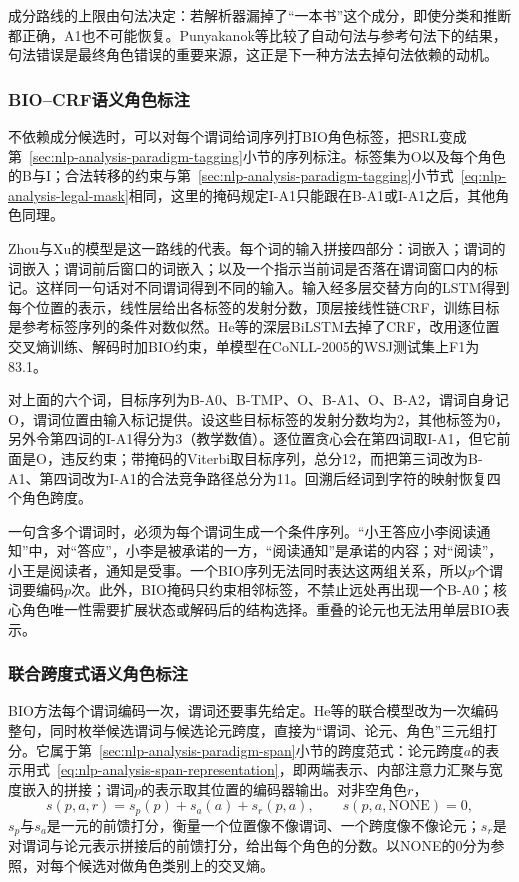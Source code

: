 成分路线的上限由句法决定：若解析器漏掉了“一本书”这个成分，即使分类和推断都正确，A1也不可能恢复。Punyakanok等比较了自动句法与参考句法下的结果，句法错误是最终角色错误的重要来源，这正是下一种方法去掉句法依赖的动机。

\subsubsection{BIO--CRF语义角色标注}
\label{sec:nlp-analysis-srl-crf}

不依赖成分候选时，可以对每个谓词给词序列打BIO角色标签，把SRL变成第~\ref{sec:nlp-analysis-paradigm-tagging}小节的序列标注。标签集为O以及每个角色的B与I；合法转移的约束与第~\ref{sec:nlp-analysis-paradigm-tagging}小节式~\eqref{eq:nlp-analysis-legal-mask}相同，这里的掩码规定I-A1只能跟在B-A1或I-A1之后，其他角色同理。

Zhou与Xu的模型是这一路线的代表。每个词的输入拼接四部分：词嵌入；谓词的词嵌入；谓词前后窗口的词嵌入；以及一个指示当前词是否落在谓词窗口内的标记。这样同一句话对不同谓词得到不同的输入。输入经多层交替方向的LSTM得到每个位置的表示，线性层给出各标签的发射分数，顶层接线性链CRF，训练目标是参考标签序列的条件对数似然。He等的深层BiLSTM去掉了CRF，改用逐位置交叉熵训练、解码时加BIO约束，单模型在CoNLL-2005的WSJ测试集上F1为83.1。

对上面的六个词，目标序列为B-A0、B-TMP、O、B-A1、O、B-A2，谓词自身记O，谓词位置由输入标记提供。设这些目标标签的发射分数均为2，其他标签为0，另外令第四词的I-A1得分为3（教学数值）。逐位置贪心会在第四词取I-A1，但它前面是O，违反约束；带掩码的Viterbi取目标序列，总分12，而把第三词改为B-A1、第四词改为I-A1的合法竞争路径总分为11。回溯后经词到字符的映射恢复四个角色跨度。

一句含多个谓词时，必须为每个谓词生成一个条件序列。“小王答应小李阅读通知”中，对“答应”，小李是被承诺的一方，“阅读通知”是承诺的内容；对“阅读”，小王是阅读者，通知是受事。一个BIO序列无法同时表达这两组关系，所以$p$个谓词要编码$p$次。此外，BIO掩码只约束相邻标签，不禁止远处再出现一个B-A0；核心角色唯一性需要扩展状态或解码后的结构选择。重叠的论元也无法用单层BIO表示。

\subsubsection{联合跨度式语义角色标注}
\label{sec:nlp-analysis-srl-span}

BIO方法每个谓词编码一次，谓词还要事先给定。He等的联合模型改为一次编码整句，同时枚举候选谓词与候选论元跨度，直接为“谓词、论元、角色”三元组打分。它属于第~\ref{sec:nlp-analysis-paradigm-span}小节的跨度范式：论元跨度$a$的表示用式~\eqref{eq:nlp-analysis-span-representation}，即两端表示、内部注意力汇聚与宽度嵌入的拼接；谓词$p$的表示取其位置的编码器输出。对非空角色$r$，
\[
 s(p,a,r)=s_p(p)+s_a(a)+s_r(p,a),\qquad
 s(p,a,\mathrm{NONE})=0,
\]
$s_p$与$s_a$是一元的前馈打分，衡量一个位置像不像谓词、一个跨度像不像论元；$s_r$是对谓词与论元表示拼接后的前馈打分，给出每个角色的分数。以NONE的0分为参照，对每个候选对做角色类别上的交叉熵。

